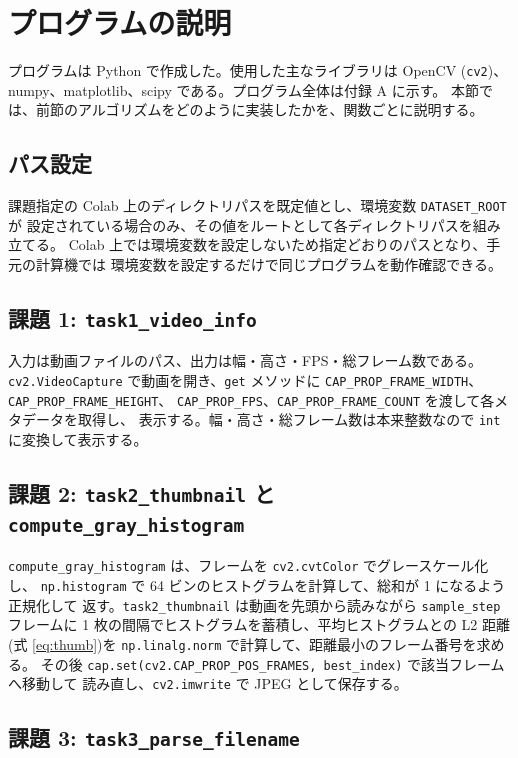 \section{プログラムの説明}

プログラムは Python で作成した。使用した主なライブラリは OpenCV ({\tt cv2})、
numpy、matplotlib、scipy である。プログラム全体は付録 A に示す。
本節では、前節のアルゴリズムをどのように実装したかを、関数ごとに説明する。

\subsection{パス設定}

課題指定の Colab 上のディレクトリパスを既定値とし、環境変数 {\tt DATASET\_ROOT} が
設定されている場合のみ、その値をルートとして各ディレクトリパスを組み立てる。
Colab 上では環境変数を設定しないため指定どおりのパスとなり、手元の計算機では
環境変数を設定するだけで同じプログラムを動作確認できる。

\subsection{課題 1: {\tt task1\_video\_info}}

入力は動画ファイルのパス、出力は幅・高さ・FPS・総フレーム数である。
{\tt cv2.VideoCapture} で動画を開き、{\tt get} メソッドに
{\tt CAP\_PROP\_FRAME\_WIDTH}、{\tt CAP\_PROP\_FRAME\_HEIGHT}、
{\tt CAP\_PROP\_FPS}、{\tt CAP\_PROP\_FRAME\_COUNT} を渡して各メタデータを取得し、
表示する。幅・高さ・総フレーム数は本来整数なので {\tt int} に変換して表示する。

\subsection{課題 2: {\tt task2\_thumbnail} と {\tt compute\_gray\_histogram}}

{\tt compute\_gray\_histogram} は、フレームを {\tt cv2.cvtColor} でグレースケール化し、
{\tt np.histogram} で 64 ビンのヒストグラムを計算して、総和が 1 になるよう正規化して
返す。{\tt task2\_thumbnail} は動画を先頭から読みながら {\tt sample\_step} フレームに
1 枚の間隔でヒストグラムを蓄積し、平均ヒストグラムとの L2 距離
(式 \ref{eq:thumb})を {\tt np.linalg.norm} で計算して、距離最小のフレーム番号を求める。
その後 {\tt cap.set(cv2.CAP\_PROP\_POS\_FRAMES, best\_index)} で該当フレームへ移動して
読み直し、{\tt cv2.imwrite} で JPEG として保存する。

\subsection{課題 3: {\tt task3\_parse\_filename}}

